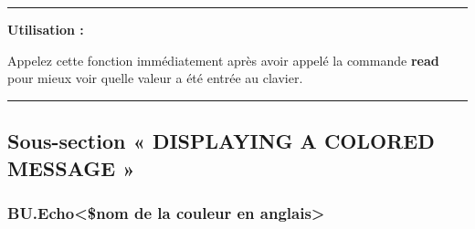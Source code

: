 \documentclass[a4paper,10pt]{article}
\begin{document}

\par\noindent\rule{\textwidth}{0.4pt}

\begin{justify}
    \textbf{Utilisation :}

    Appelez cette fonction immédiatement après avoir appelé la commande \textbf{\color{gray}read} pour mieux voir quelle valeur a été entrée au clavier.
\end{justify}




\color{sec2}\par\noindent\rule{\textwidth}{0.4pt}\color{text}\setlength{\parskip}{1em}

\color{sec2}
\subsection{Sous-section « DISPLAYING A COLORED MESSAGE »}\color{text}

\color{sec3}
\subsubsection{BU.Echo<\$nom de la couleur en anglais>}\color{text}
\end{document}
